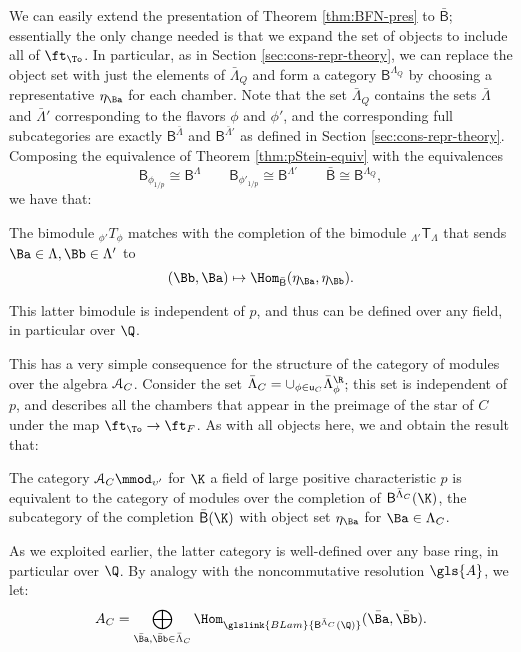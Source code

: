 We can easily extend the presentation of Theorem \ref{thm:BFN-pres} to $\bar{\mathsf B}$; essentially the only change needed is that we expand the set of objects to include all of $\ft_{\To}$.  In particular, as in Section \ref{sec:cons-repr-theory}, we can replace the object set with just the elements of $\bar{\Lambda}_Q$ and form a category $\mathsf B^{\Lambda_Q} $ by choosing a representative $\eta_{\Ba}$ for each chamber.  Note that the set $\bar{\Lambda}_Q$ contains the sets $\bar{\Lambda}$ and $\bar{\Lambda}'$ corresponding to the flavors $\phi$ and $\phi'$, and the corresponding full subcategories are exactly $\mathsf B^{\bar \Lambda}$ and $\mathsf B^{\bar \Lambda'}$ as defined in Section \ref{sec:cons-repr-theory}.  Composing the equivalence of Theorem \ref{thm:pStein-equiv} with the equivalences
\begin{equation}
{\mathsf B}_{\phi_{1/p}}\cong \mathsf B^{\Lambda}\qquad  {\mathsf B}_{\phi'_{1/p}}\cong \mathsf B^{\Lambda'}\qquad \bar{\mathsf B} \cong \mathsf B^{\Lambda_Q},\label{eq:B-Lam}
\end{equation}
we have that:
\begin{lemma}
  The bimodule ${}_{\phi'}T_\phi$ matches with the completion of the bimodule ${}_{\Lambda'}\mathsf{T}_\Lambda$ that sends $\Ba\in \Lambda,\Bb\in \Lambda'$ to
  \[(\Bb,\Ba) \mapsto \Hom_{\bar{\mathsf B}}(\eta_{\Ba},\eta_{\Bb}).\]
\end{lemma}
This latter bimodule is independent of $p$, and thus can be defined over any field, in particular over $\Q$.  
 
This has a very simple consequence for the structure of the category of modules over the algebra $\EuScript{A}_{C}$.  Consider the set $\bar{\Lambda}_C=\cup_{\phi\in \mathsf{u}_C}\bar{\Lambda}^\R_\phi$; this set is independent of $p$, and describes all the chambers that appear in the preimage of the star of $C$ under the map $\ft_{\To}\to \ft_{F}$.  As with all objects here, we and obtain the result that:
\begin{proposition}
  The category $\EuScript{A}_{C}\mmod_{\upsilon'}$ for $\K$ a field of large positive characteristic $p$ is equivalent to the category of modules over the completion of $\mathsf {B}^{
   \bar{\Lambda}_C}(\K)$, the subcategory of the completion $\bar{\mathsf B}(\K) $ with object set $\eta_{\Ba}$ for $\Ba\in \Lambda_C$.  
\end{proposition}
As we exploited earlier, the latter category is well-defined over any base ring, in particular over $\Q$.  By analogy with the noncommutative resolution $\gls{A}$, we let:
\[A_C=\bigoplus_{\bar{\Ba},\bar{\Bb}\in \bar\Lambda_C}\Hom_{\glslink{BLam}{\mathsf{B}^{\bar{\Lambda}_C}(\Q)}}(\bar{\Ba},\bar{\Bb}).\]

